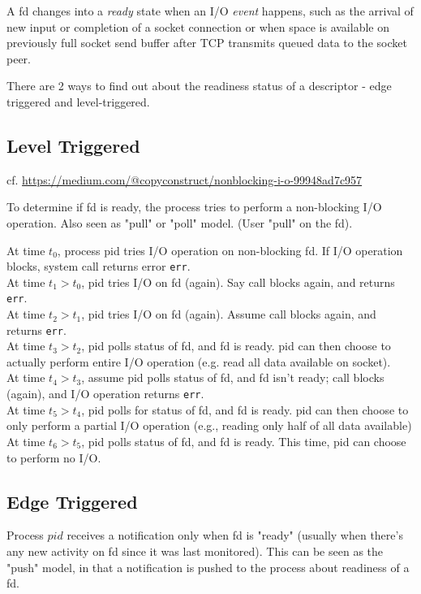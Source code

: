 \documentclass[10pt]{amsart}
\begin{document}
\begin{multicols*}{2}
A fd changes into a \emph{ready} state when an I/O \emph{event} happens, such as the arrival of new input or completion of a socket connection or when space is available on previously full socket send buffer after TCP transmits queued data to the socket peer.

There are 2 ways to find out about the readiness status of a descriptor - edge triggered and level-triggered.

\subsection{Level Triggered}

cf. \url{https://medium.com/@copyconstruct/nonblocking-i-o-99948ad7c957}

To determine if fd is ready, the process tries to perform a non-blocking I/O operation. Also seen as "pull" or "poll" model. (User "pull" on the fd).

At time $t_0$, process pid tries I/O operation on non-blocking fd. If I/O operation blocks, system call returns error \texttt{err}. \\
At time $t_1 > t_0$, pid tries I/O on fd (again). Say call blocks again, and returns \texttt{err}. \\
At time $t_2 > t_1$, pid tries I/O on fd (again). Assume call blocks again, and returns \texttt{err}. \\
At time $t_3 > t_2$, pid polls status of fd, and fd is ready. pid can then choose to actually perform entire I/O operation (e.g. read all data available on socket). \\
At time $t_4 > t_3$, assume pid polls status of fd, and fd isn't ready; call blocks (again), and I/O operation returns \texttt{err}. \\
At time $t_5 > t_4$, pid polls for status of fd, and fd is ready. pid can then choose to only perform a partial I/O operation (e.g., reading only half of all data available) \\
At time $t_6 > t_5$, pid polls status of fd, and fd is ready. This time, pid can choose to perform no I/O.

\subsection{Edge Triggered}

Process $pid$ receives a notification only when fd is "ready" (usually when there's any new activity on fd since it was last monitored). This can be seen as the "push" model, in that a notification is pushed to the process about readiness of a fd.









\end{multicols*}
\end{document}
